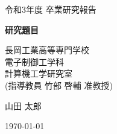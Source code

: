 \documentclass[uplatex, 12pt, a4paper, dvipdfmx]{jsreport}
\begin{document}
\begin{titlepage}
\begin{center}

  \vspace*{135truept}
  
  {\LARGE 令和3年度 卒業研究報告}
  
  \vspace{100truept}

  {\Huge\bfseries\sffamily\gtfamily
  研究題目
  }

  \vspace{100truept}
  
  {\Large 長岡工業高等専門学校\\電子制御工学科\\計算機工学研究室\\}  
  {\Large (指導教員\hspace{20truept} 竹部 啓輔 准教授)}
  
  \vspace{70truept}

  {\LARGE 
  山田 太郎
  }

  \vspace{70truept}
  
  {\LARGE
  \today
  }

\end{center}
\end{titlepage}
\end{document}
